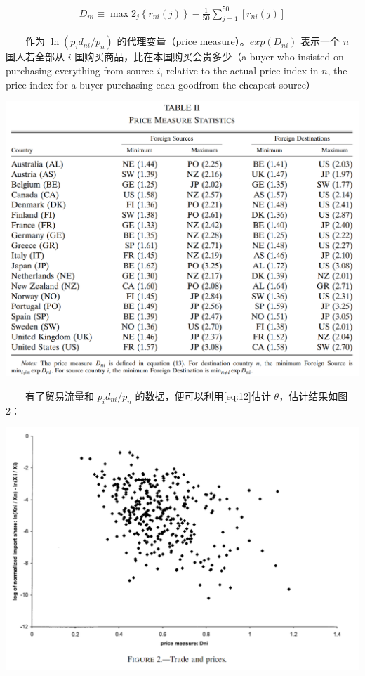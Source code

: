 \documentclass[
]{article}
\begin{document}
\begin{align}
D_{n i} \equiv \max 2_{j}\left\{r_{n i}(j)\right\}-\frac{1}{50}\sum_{j=1}^{50}\left[r_{n i}(j)\right] \label{eq:13}
\end{align}

　　作为 \(\ln ({p_{i} d_{n i}}/{p_{n}})\) 的代理变量（price measure）。\(exp(D_{n i})\) 表示一个 \(n\) 国人若全部从 \(i\) 国购买商品，比在本国购买会贵多少（a buyer who insisted on purchasing everything from source \(i\), relative to the actual price index in \(n\), the price index for a buyer purchasing each goodfrom the cheapest source）

\begin{center}\includegraphics[width=0.8\linewidth]{Figures/Table2} \end{center}

　　有了贸易流量和 \({p_{i} d_{n i}}/{p_{n}}\) 的数据，便可以利用\eqref{eq:12}估计 \(\theta\)，估计结果如图2：

\begin{center}\includegraphics[width=0.8\linewidth]{Figures/Figure2} \end{center}
\end{document}
